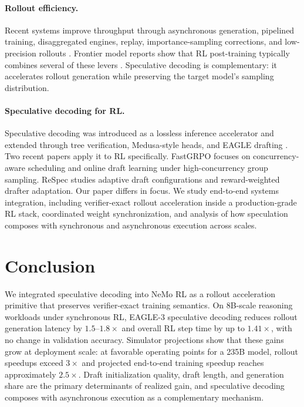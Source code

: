 \documentclass[11pt, logo, onecolumn, copyright, colorlinks=true, allcolors=blue]{nvidiatechreport}
\begin{document}
\paragraph{Rollout efficiency.}
Recent systems improve throughput through asynchronous generation, pipelined training, disaggregated engines, replay, importance-sampling corrections, and low-precision rollouts \citep{noukhovitch2024async,piche2025pipelinerl,meta2025llamarl,li2025repo,zheng2025gspo,wang2025aspo,sheng2026espo,xi2026jetrl,qiu2026fp8rl,li2026qurl,zheng2025greso}. Frontier model reports show that RL post-training typically combines several of these levers \citep{deepseek2024v3,yang2025qwen3,minimax2025m1,minimax2025m2,glm2025arc,deepseek2025v32,moonshot2026kimik25,glm2026_5,nvidia2026nemotron3superopen}. Speculative decoding is complementary: it accelerates rollout generation while preserving the target model's sampling distribution.

\paragraph{Speculative decoding for RL.}
Speculative decoding was introduced as a lossless inference accelerator \citep{leviathan2023fast,chen2023speculative} and extended through tree verification, Medusa-style heads, and EAGLE drafting \citep{zhang2024draftverify,cai2024medusa,miao2024specinfer,li2024eagle,li2025eagle3,mtp2024}. Two recent papers apply it to RL specifically. FastGRPO \citep{zhang2025fastgrpo} focuses on concurrency-aware scheduling and online draft learning under high-concurrency group sampling. ReSpec \citep{chen2025respec} studies adaptive draft configurations and reward-weighted drafter adaptation. Our paper differs in focus. We study end-to-end systems integration, including verifier-exact rollout acceleration inside a production-grade RL stack, coordinated weight synchronization, and analysis of how speculation composes with synchronous and asynchronous execution across scales.

\section{Conclusion}
\label{sec:conclusion}

We integrated speculative decoding into NeMo RL as a rollout acceleration primitive that preserves verifier-exact training semantics. On 8B-scale reasoning workloads under synchronous RL, EAGLE-3 speculative decoding reduces rollout generation latency by $1.5$--$1.8\times$ and overall RL step time by up to $1.41\times$, with no change in validation accuracy. Simulator projections show that these gains grow at deployment scale: at favorable operating points for a 235B model, rollout speedups exceed $3\times$ and projected end-to-end training speedup reaches approximately $2.5\times$. Draft initialization quality, draft length, and generation share are the primary determinants of realized gain, and speculative decoding composes with asynchronous execution as a complementary mechanism.



\end{document}
